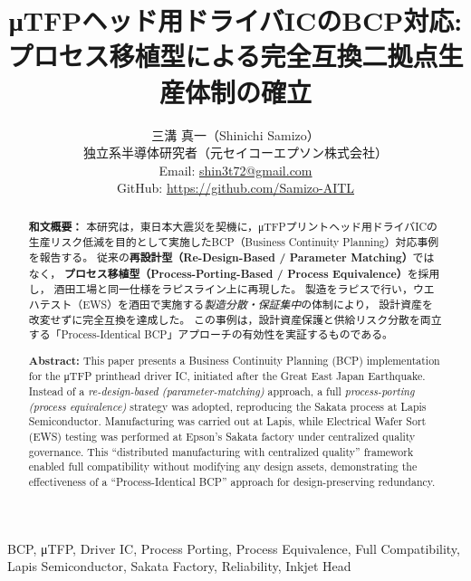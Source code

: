 \documentclass[conference]{IEEEtran}
\begin{document}
\title{%
μTFPヘッド用ドライバICのBCP対応:\\
\textbf{プロセス移植型による完全互換二拠点生産体制の確立}
}

\author{%
三溝 真一（Shinichi Samizo）\\
独立系半導体研究者（元セイコーエプソン株式会社）\\
Email: \href{mailto:shin3t72@gmail.com}{shin3t72@gmail.com} \\
GitHub: \url{https://github.com/Samizo-AITL}
}

\maketitle

\begin{abstract}
\textbf{和文概要：}
本研究は，東日本大震災を契機に，μTFPプリントヘッド用ドライバICの生産リスク低減を目的として実施したBCP（Business Continuity Planning）対応事例を報告する。
従来の\textbf{再設計型（Re-Design-Based / Parameter Matching）}ではなく，
\textbf{プロセス移植型（Process-Porting-Based / Process Equivalence）}を採用し，
酒田工場と同一仕様をラピスライン上に再現した。
製造をラピスで行い，ウエハテスト（EWS）を酒田で実施する\emph{製造分散・保証集中}の体制により，
設計資産を改変せずに完全互換を達成した。
この事例は，設計資産保護と供給リスク分散を両立する「Process-Identical BCP」アプローチの有効性を実証するものである。

\medskip
\textbf{Abstract:}
This paper presents a Business Continuity Planning (BCP) implementation for the μTFP printhead driver IC, initiated after the Great East Japan Earthquake.
Instead of a \textit{re-design-based (parameter-matching)} approach, a full \textit{process-porting (process equivalence)} strategy was adopted, reproducing the Sakata process at Lapis Semiconductor.
Manufacturing was carried out at Lapis, while Electrical Wafer Sort (EWS) testing was performed at Epson’s Sakata factory under centralized quality governance.
This “distributed manufacturing with centralized quality” framework enabled full compatibility without modifying any design assets, demonstrating the effectiveness of a “Process-Identical BCP” approach for design-preserving redundancy.
\end{abstract}

\begin{IEEEkeywords}
BCP, μTFP, Driver IC, Process Porting, Process Equivalence, Full Compatibility, Lapis Semiconductor, Sakata Factory, Reliability, Inkjet Head
\end{IEEEkeywords}
\end{document}
